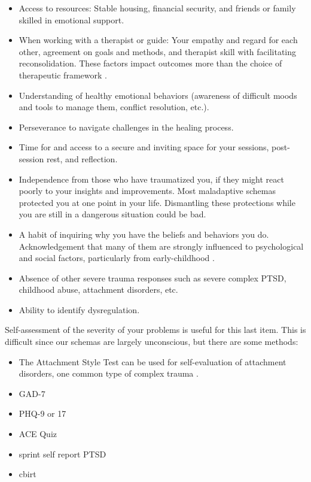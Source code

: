 \documentclass[12pt,letterpaper]{article}
\begin{document}
\begin{itemize}
    \item Access to resources: Stable housing, financial security, and friends or family skilled in emotional support.
    \item When working with a therapist or guide: Your empathy and regard for each other, agreement on goals and methods, and therapist skill with facilitating reconsolidation. These factors impact outcomes more than the choice of therapeutic framework \cite{wampoldCommonFactors}.
    \item Understanding of healthy emotional behaviors (awareness of difficult moods and tools to manage them, conflict resolution, etc.). 
    \item Perseverance to navigate challenges in the healing process.
    \item Time for and access to a secure and inviting space for your sessions, post-session rest, and reflection.
    \item Independence from those who have traumatized you, if they might react poorly to your insights and improvements. Most maladaptive schemas protected you at one point in your life. Dismantling these protections while you are still in a dangerous situation could be bad.
    \item A habit of inquiring why you have the beliefs and behaviors you do. Acknowledgement that many of them are strongly influenced to psychological and social factors, particularly from early-childhood \cite{brownAttachmentDisturbances}. 
    \item Absence of other severe trauma responses such as severe complex PTSD, childhood abuse, attachment disorders, etc.
    \item Ability to identify dysregulation.
\end{itemize}
Self-assessment of the severity of your problems is useful for this last item. This is difficult since our schemas are largely unconscious, but there are some methods:
\begin{itemize}
    \item The Attachment Style Test can be used for self-evaluation of attachment disorders, one common type of complex trauma \cite{attachmentProject}.
    \item GAD-7
    \item PHQ-9 or 17
    \item ACE Quiz
    \item sprint self report PTSD
    \item cbirt
\end{itemize}
\end{document}
